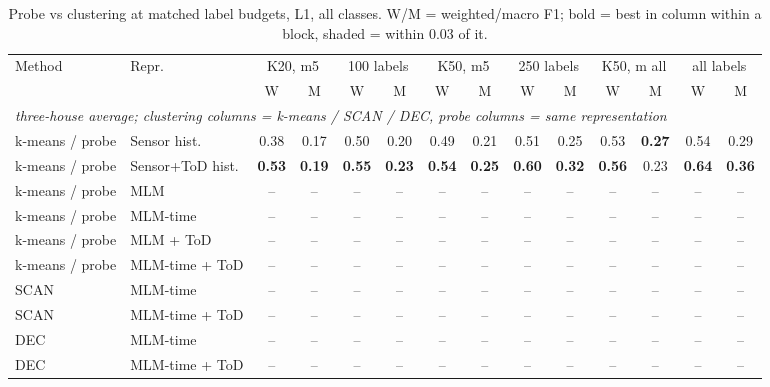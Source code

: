 \begin{table}[H]
\centering\small
\caption{Probe vs clustering at matched label budgets, L1, all classes. W/M = weighted/macro F1; bold = best in column within a block, shaded = within 0.03 of it.}
\label{tab:cmp_l1_all}
\setlength{\tabcolsep}{3.5pt}
\begin{tabular}{llcc|cc|cc|cc|cc|cc}
\toprule
Method & Repr. & \multicolumn{2}{c}{K20, m5} & \multicolumn{2}{c}{100 labels} & \multicolumn{2}{c}{K50, m5} & \multicolumn{2}{c}{250 labels} & \multicolumn{2}{c}{K50, m all} & \multicolumn{2}{c}{all labels} \\
\cmidrule(lr){3-4}\cmidrule(lr){5-6}\cmidrule(lr){7-8}\cmidrule(lr){9-10}\cmidrule(lr){11-12}\cmidrule(lr){13-14}
 & & W & M & W & M & W & M & W & M & W & M & W & M \\
\midrule
\multicolumn{14}{l}{\textit{three-house average; clustering columns = k-means / SCAN / DEC, probe columns = same representation}} \\
\midrule
k-means / probe & Sensor hist. & 0.38 & \cellcolor{blue!12}0.17 & 0.50 & \cellcolor{blue!12}0.20 & 0.49 & 0.21 & 0.51 & 0.25 & \cellcolor{blue!12}0.53 & \cellcolor{blue!12}\textbf{0.27} & 0.54 & 0.29 \\
k-means / probe & Sensor+ToD hist. & \cellcolor{blue!12}\textbf{0.53} & \cellcolor{blue!12}\textbf{0.19} & \cellcolor{blue!12}\textbf{0.55} & \cellcolor{blue!12}\textbf{0.23} & \cellcolor{blue!12}\textbf{0.54} & \cellcolor{blue!12}\textbf{0.25} & \cellcolor{blue!12}\textbf{0.60} & \cellcolor{blue!12}\textbf{0.32} & \cellcolor{blue!12}\textbf{0.56} & 0.23 & \cellcolor{blue!12}\textbf{0.64} & \cellcolor{blue!12}\textbf{0.36} \\
\cmidrule{1-14}
k-means / probe & MLM & -- & -- & -- & -- & -- & -- & -- & -- & -- & -- & -- & -- \\
k-means / probe & MLM-time & -- & -- & -- & -- & -- & -- & -- & -- & -- & -- & -- & -- \\
k-means / probe & MLM + ToD & -- & -- & -- & -- & -- & -- & -- & -- & -- & -- & -- & -- \\
k-means / probe & MLM-time + ToD & -- & -- & -- & -- & -- & -- & -- & -- & -- & -- & -- & -- \\
\cmidrule{1-14}
SCAN & MLM-time & -- & -- & -- & -- & -- & -- & -- & -- & -- & -- & -- & -- \\
SCAN & MLM-time + ToD & -- & -- & -- & -- & -- & -- & -- & -- & -- & -- & -- & -- \\
\cmidrule{1-14}
DEC & MLM-time & -- & -- & -- & -- & -- & -- & -- & -- & -- & -- & -- & -- \\
DEC & MLM-time + ToD & -- & -- & -- & -- & -- & -- & -- & -- & -- & -- & -- & -- \\
\bottomrule
\end{tabular}
\end{table}

